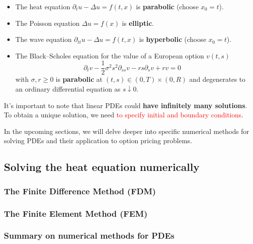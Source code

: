 \begin{itemize}
  \item The heat equation $\partial_t u - \Delta u = f(t, x)$ is \textbf{parabolic} (choose $x_0 = t$).
  \item The Poisson equation $\Delta u = f(x)$ is \textbf{elliptic}.
  \item The wave equation $\partial_{tt}u - \Delta u = f(t, x)$ is \textbf{hyperbolic} (choose $x_0 = t$).
  \item The Black–Scholes equation for the value of a European option $v(t, s)$
  \[\partial_t v - \frac{1}{2} \sigma^2 s^2 \partial_{ss}v - rs \partial_s v + rv = 0\]
  with $\sigma, r \geq 0$ is \textbf{parabolic} at $(t, s) \in (0, T) \times (0, R)$ and degenerates to an ordinary differential equation as $s \downarrow 0$.
\end{itemize}

It's important to note that linear PDEs could \textbf{have infinitely many solutions}. To obtain a unique solution, we need \textcolor{red}{to specify initial and boundary conditions}.

In the upcoming sections, we will delve deeper into specific numerical methods for solving PDEs and their application to option pricing problems.

\subsection{Solving the heat equation numerically}



\subsubsection{The Finite Difference Method (FDM)}



\subsubsection{The Finite Element Method (FEM)}



\subsubsection{Summary on numerical methods for PDEs}


